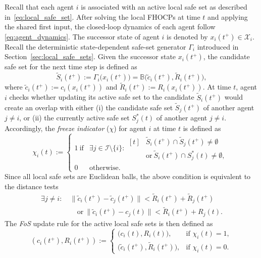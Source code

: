 \documentclass[twocolumn]{autart}
\begin{document}
Recall that each agent $i$ is associated with an active local safe set as described in~\eqref{eq:local_safe_set}.
After solving the local FHOCPs at time \(t\) and applying the
shared first input, the closed-loop dynamics of each agent follow
\eqref{eq:agent_dynamics}.
The successor state of agent \(i\) is denoted by
\(
x_i(t^+) \in \mathcal X_i.
\)
Recall the deterministic state-dependent safe-set generator
\(\Gamma_i\) introduced in Section~\ref{sec:local_safe_sets}.
Given the successor state \(x_i(t^+)\), the candidate safe set for the
next time step is defined as
\begin{equation}
\tilde S_i(t^+)
:=
\Gamma_i\bigl(x_i(t^+)\bigr)
=
\mathbb{B}\bigl(\tilde c_i(t^+), \tilde R_i(t^+)\bigr),
\label{eq:candidate_safe_set}
\end{equation}
where \(\tilde c_i(t^+):=c_i(x_i(t^+))\) and \(\tilde R_i(t^+):=R_i(x_i(t^+))\). At time \(t\), agent \(i\) checks whether updating its active safe set
to the candidate \(\tilde S_i(t^+)\) would create an overlap with
either (i) the candidate safe set \(\tilde S_j(t^+)\) of another agent
\(j\neq i\), or (ii) the currently active safe set \(S_j^\ast(t)\) of
another agent \(j\neq i\). Accordingly, the \emph{freeze indicator} ($\chi$) for agent $i$ at time $t$ is defined as
\begin{equation}
\label{eq:freezeIndicator}
\chi_i(t)
:=
\begin{cases}
1 \ \text{if} & \exists j\in\mathcal{I}\setminus\{i\}: 
\begin{aligned}[t]
&\tilde{S}_i(t^+)\cap \tilde{S}_j(t^+)\neq\emptyset \\
\ \ &\text{or}\ \tilde{S}_i(t^+)\cap S_j^\ast(t)\neq\emptyset,
\end{aligned}
\\[0.2em]
0 & \text{otherwise}.
\end{cases}
\end{equation}
Since all local safe sets are Euclidean balls, the above condition is equivalent to the distance tests
\begin{align}
    \exists j \neq i:\ 
    &\|\tilde{c}_i(t^+) - \tilde{c}_j(t^+)\|
      < \tilde{R}_i(t^+) + \tilde{R}_j(t^+)
      \nonumber\\
      &\quad \text{or}\ 
      \|\tilde{c}_i(t^+) - c_j(t)\|
      < \tilde{R}_i(t^+) + R_j(t).
\label{eq:freeze_distance_test}
\end{align}
The \emph{FoS} update rule for the active local safe sets is then
defined as
\begin{equation}
\label{eq:freeze_shift_update}
(c_i(t^+), R_i(t^+))
:=
\begin{cases}
\big(c_i(t), R_i(t)\big), &\text{if } \chi_i(t)=1,\\[0.2em]
\big(\tilde{c}_i(t^+), \tilde{R}_i(t^+)\big), &\text{if } \chi_i(t)=0.
\end{cases}
\end{equation}
\end{document}

